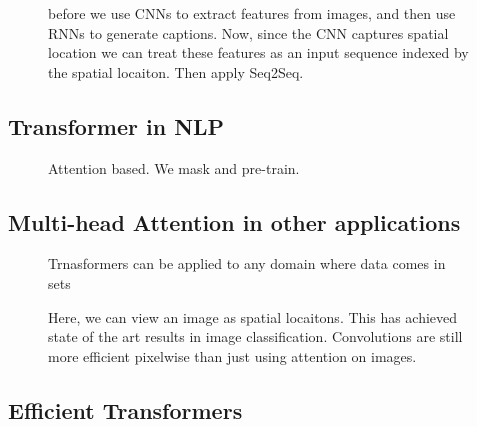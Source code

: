 \documentclass[11pt]{article}
\begin{document}
\begin{figure}[H]
    \centering
    \caption{before we use CNNs to extract features from images, and then use RNNs to generate captions. Now, since the CNN captures spatial location we can treat these features as an input sequence indexed by the spatial locaiton. Then apply Seq2Seq.}
\end{figure}

\subsection{Transformer in NLP}

\begin{figure}[H]
    \centering
    \caption{Attention based. We mask and pre-train.}
\end{figure}

\begin{figure}[H]
    \centering
    \caption{}
\end{figure}

\subsection{Multi-head Attention in other applications}

\begin{figure}[H]
    \centering
    \caption{Trnasformers can be applied to any domain where data comes in sets}
\end{figure}

\begin{figure}[H]
    \centering
    \caption{Here, we can view an image as spatial locaitons. This has achieved state of the art results in image classification. Convolutions are still more efficient pixelwise than just using attention on images.}
\end{figure}

\begin{figure}[H]
    \centering
    \caption{}
\end{figure}

\subsection{Efficient Transformers}
\end{document}
